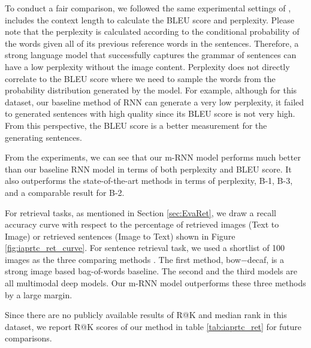 To conduct a fair comparison, we followed the same experimental settings of \cite{kiros2013multimodal}, includes the context length to calculate the BLEU score and perplexity.
Please note that the perplexity is calculated according to the conditional probability of the words given all of its previous reference words in the sentences.
Therefore, a strong language model that successfully captures the grammar of sentences can have a low perplexity without the image content. 
Perplexity does not directly correlate to the BLEU score where we need to sample the words from the probability distribution generated by the model.
For example, although for this dataset, our baseline method of RNN can generate a very low perplexity, it failed to generated sentences with high quality since its BLEU score is not very high.
From this perspective, the BLEU score is a better measurement for the generating sentences.

From the experiments, we can see that our m-RNN model performs much better than our baseline RNN model in terms of both perplexity and BLEU score.
It also outperforms the state-of-the-art methods in terms of perplexity, B-1, B-3, and a comparable result for B-2.

For retrieval tasks, as mentioned in Section \ref{sec:EvaRet}, we draw a recall accuracy curve with respect to the percentage of retrieved images (Text to Image) or retrieved sentences (Image to Text) shown in Figure \ref{fig:iaprtc_ret_curve}.
For sentence retrieval task, we used a shortlist of 100 images as the three comparing methods \cite{kiros2013multimodal}.
The first method, bow−decaf, is a strong image based bag-of-words baseline.
The second and the third models are all multimodal deep models.
Our m-RNN model outperforms these three methods by a large margin.

Since there are no publicly available results of R@K and median rank in this dataset, we report R@K scores of our method in table \ref{tab:iaprtc_ret} for future comparisons.

